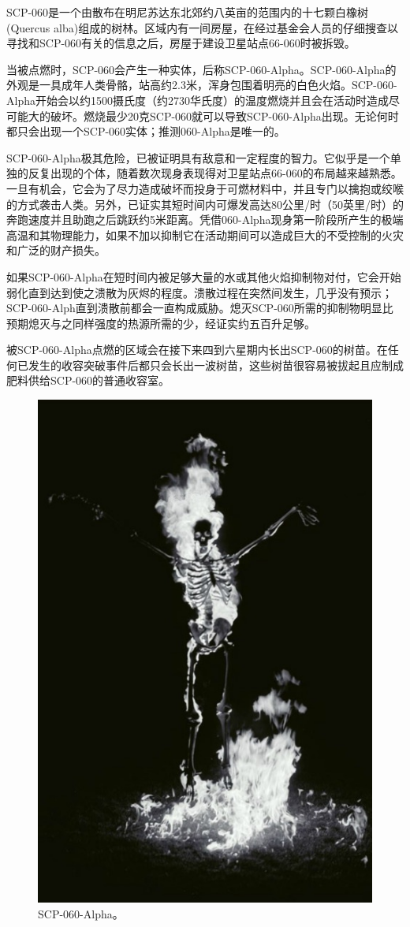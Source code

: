 SCP-060是一个由散布在明尼苏达东北郊约八英亩的范围内的十七颗白橡树(Quercus alba)组成的树林。区域内有一间房屋，在经过基金会人员的仔细搜查以寻找和SCP-060有关的信息之后，房屋于建设卫星站点66-060时被拆毁。

当被点燃时，SCP-060会产生一种实体，后称SCP-060-Alpha。SCP-060-Alpha的外观是一具成年人类骨骼，站高约2.3米，浑身包围着明亮的白色火焰。SCP-060-Alpha开始会以约1500摄氏度（约2730华氏度）的温度燃烧并且会在活动时造成尽可能大的破坏。燃烧最少20克SCP-060就可以导致SCP-060-Alpha出现。无论何时都只会出现一个SCP-060实体；推测060-Alpha是唯一的。

SCP-060-Alpha极其危险，已被证明具有敌意和一定程度的智力。它似乎是一个单独的反复出现的个体，随着数次现身表现得对卫星站点66-060的布局越来越熟悉。一旦有机会，它会为了尽力造成破坏而投身于可燃材料中，并且专门以擒抱或绞喉的方式袭击人类。另外，已证实其短时间内可爆发高达80公里\slash 时（50英里\slash 时）的奔跑速度并且助跑之后跳跃约5米距离。凭借060-Alpha现身第一阶段所产生的极端高温和其物理能力，如果不加以抑制它在活动期间可以造成巨大的不受控制的火灾和广泛的财产损失。

如果SCP-060-Alpha在短时间内被足够大量的水或其他火焰抑制物对付，它会开始弱化直到达到使之溃散为灰烬的程度。溃散过程在突然间发生，几乎没有预示；SCP-060-Alph直到溃散前都会一直构成威胁。熄灭SCP-060所需的抑制物明显比预期熄灭与之同样强度的热源所需的少，经证实约五百升足够。

被SCP-060-Alpha点燃的区域会在接下来四到六星期内长出SCP-060的树苗。在任何已发生的收容突破事件后都只会长出一波树苗，这些树苗很容易被拔起且应制成肥料供给SCP-060的普通收容室。

\begin{figure}[H]
    \centering
    \includegraphics[width=0.5\linewidth]{images/SCP.060.2.jpg}
    \caption*{SCP-060-Alpha。}
\end{figure}

